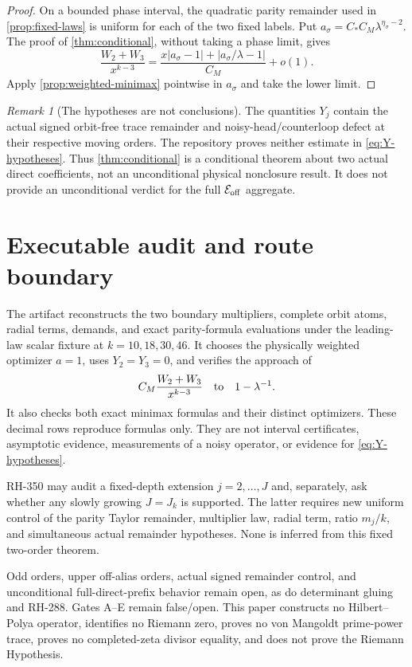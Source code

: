 \documentclass[11pt]{article}
\theoremstyle{remark}
\newtheorem{remark}[theorem]{Remark}
\newcommand{\cE}{\mathcal E}
\begin{document}
\begin{proof}
On a bounded phase interval, the quadratic parity remainder used in
\cref{prop:fixed-laws} is uniform for each of the two fixed labels.  Put
$a_\sigma=C_*C_M\lambda^{\eta_\sigma-2}$.  The proof of
\cref{thm:conditional}, without taking a phase limit, gives
\[
 \frac{W_2+W_3}{x^{k-3}}
 =\frac{x|a_\sigma-1|+|a_\sigma/\lambda-1|}{C_M}+o(1).
\]
Apply \cref{prop:weighted-minimax} pointwise in $a_\sigma$ and take the
lower limit.
\end{proof}

\begin{remark}[The hypotheses are not conclusions]
The quantities $Y_j$ contain the actual signed orbit-free trace remainder
and noisy-head/counterloop defect at their respective moving orders.  The
repository proves neither estimate in \eqref{eq:Y-hypotheses}.  Thus
\cref{thm:conditional} is a conditional theorem about two actual direct
coefficients, not an unconditional physical nonclosure result.  It does not
provide an unconditional verdict for the full $\cE_{\rm off}$ aggregate.
\end{remark}

\section{Executable audit and route boundary}

The artifact reconstructs the two boundary multipliers, complete orbit
atoms, radial terms, demands, and exact parity-formula evaluations under the
leading-law scalar fixture at $k=10,18,30,46$.  It chooses the physically
weighted optimizer $a=1$, uses $Y_2=Y_3=0$, and verifies the approach of
\[
 C_M\frac{W_2+W_3}{x^{k-3}}
 \quad\hbox{to}\quad 1-\lambda^{-1}.
\]
It also checks both exact minimax formulas and their distinct optimizers.
These decimal rows reproduce formulas only.  They are not interval
certificates, asymptotic evidence, measurements of a noisy operator, or
evidence for \eqref{eq:Y-hypotheses}.

RH-350 may audit a fixed-depth extension $j=2,\ldots,J$ and, separately,
ask whether any slowly growing $J=J_k$ is supported.  The latter requires
new uniform control of the parity Taylor remainder, multiplier law, radial
term, ratio $m_j/k$, and simultaneous actual remainder hypotheses.  None is
inferred from this fixed two-order theorem.

Odd orders, upper off-alias orders, actual signed remainder control, and
unconditional full-direct-prefix behavior remain open, as do determinant
gluing and RH-288.  Gates
A--E remain false/open.  This paper constructs no Hilbert--Polya operator,
identifies no Riemann zero, proves no von Mangoldt prime-power trace, proves
no completed-zeta divisor equality, and does not prove the Riemann
Hypothesis.



\end{document}
